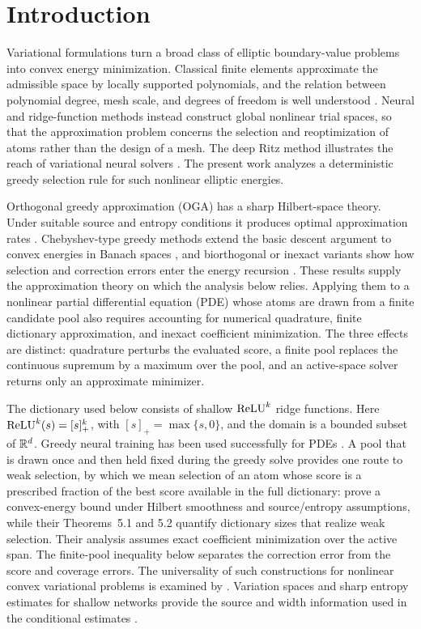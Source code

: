 \section{Introduction}
\label{sec:introduction}

Variational formulations turn a broad class of elliptic boundary-value problems into convex energy
minimization. Classical finite elements approximate the admissible space by locally supported
polynomials, and the relation between polynomial degree, mesh scale, and degrees of freedom is well
understood \citep{BrennerScott2008}. Neural and ridge-function methods instead construct global
nonlinear trial spaces, so that the approximation problem concerns the selection and
reoptimization of atoms rather than the design of a mesh. The deep Ritz method illustrates the
reach of variational neural solvers \citep{EYu2018}. The present work analyzes a deterministic
greedy selection rule for such nonlinear elliptic energies.

Orthogonal greedy approximation (OGA) has a sharp Hilbert-space theory. Under suitable source and
entropy conditions it produces optimal approximation rates
\citep{SiegelXuOGA2022,LiSiegelEntropy2024}. Chebyshev-type greedy methods extend the basic descent
argument to convex energies in Banach spaces \citep{TemlyakovCGA2013,TemlyakovGreedy2014}, and
biorthogonal or inexact variants show how selection and correction errors enter the energy recursion
\citep{DereventsovTemlyakov2022}. These results supply the approximation theory on which the analysis
below relies. Applying them to a nonlinear partial differential equation (PDE) whose atoms are drawn
from a finite candidate pool also requires accounting for numerical quadrature, finite dictionary
approximation, and inexact coefficient minimization. The three effects are distinct: quadrature
perturbs the evaluated score, a finite pool replaces the continuous supremum by a maximum over the
pool, and an active-space solver returns only an approximate minimizer.

The dictionary used below consists of shallow \(\operatorname{ReLU}^k\) ridge functions. Here
\(\operatorname{ReLU}^k(s)=[s]_+^k\), with \([s]_+=\max\{s,0\}\), and the domain is a bounded subset of
\(\mathbb{R}^d\). Greedy neural training has been used successfully for PDEs
\citep{SiegelHongJinHaoXu2023}. A pool that is drawn once and then held fixed during the greedy
solve provides one route to weak selection, by which we mean selection of an atom whose score is a
prescribed fraction of the best score available in the full dictionary:
\citet[Theorem~3.1]{XuXu2025} prove a convex-energy bound under Hilbert smoothness and
source/entropy assumptions, while their Theorems~5.1 and 5.2 quantify dictionary sizes that
realize weak selection. Their analysis assumes exact coefficient minimization over the active
span. The finite-pool inequality below separates the correction error from the score and coverage
errors. The universality of such constructions for nonlinear convex variational problems is
examined by \citet{BernaFalco2025}. Variation spaces and sharp entropy estimates for shallow
networks provide the source and width information used in the conditional estimates
\citep{SiegelXuVariation2023,SiegelXuSharp2024,MaoSiegelXu2026}.

